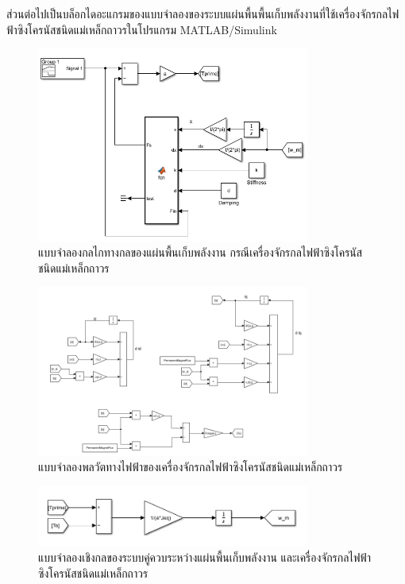 \documentclass[11pt,a4paper]{article}
\begin{document}
ส่วนต่อไปเป็นบล็อกไดอะแกรมของแบบจำลองของระบบแผ่นพื้นพื้นเก็บพลังงานที่ใช้เครื่องจักรกลไฟฟ้าซิงโครนัสชนิดแม่เหล็กถาวรในโปรแกรม MATLAB/Simulink 
\begin{figure}[H]
    \centering
    \includegraphics[width=0.8\textwidth]{mech_model_ac.png}
    \caption{แบบจำลองกลไกทางกลของแผ่นพื้นเก็บพลังงาน กรณีเครื่องจักรกลไฟฟ้าซิงโครนัสชนิดแม่เหล็กถาวร}
\end{figure}
\begin{figure}[H]
    \centering
    \includegraphics[width=0.8\textwidth]{elec_model_ac.png}
    \caption{แบบจำลองพลวัตทางไฟฟ้าของเครื่องจักรกลไฟฟ้าซิงโครนัสชนิดแม่เหล็กถาวร}  
\end{figure}
\begin{figure}[H]
    \centering
    \includegraphics[width=0.8\textwidth]{mech_ac_coupling_model.png}
    \caption{แบบจำลองเชิงกลของระบบคู่ควบระหว่างแผ่นพื้นเก็บพลังงาน และเครื่องจักรกลไฟฟ้าซิงโครนัสชนิดแม่เหล็กถาวร}
\end{figure}
\end{document}
